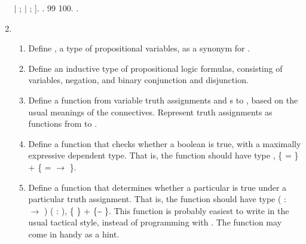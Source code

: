 \documentclass[12pt]{report}
\begin{document}
\begin{enumerate}
\begin{coqdoccode}
\coqdocindent{4.00em}
 \ensuremath{|}\coqdoceol
\coqdocindent{4.00em}
 ;  \ensuremath{|}\coqdoceol
\coqdocindent{4.00em}
 ;  ].\coqdoceol
\coqdocindent{1.00em}
.\coqdoceol
\coqdocemptyline
\coqdocindent{1.00em}
    99 100.\coqdoceol
\coqdocemptyline
\coqdocnoindent
{} .\coqdoceol
\coqdocemptyline
\end{coqdoccode}
\item \begin{enumerate}
  \item Define , a type of propositional variables, as a synonym for .
  \item Define an inductive type  of propositional logic formulas, consisting of variables, negation, and binary conjunction and disjunction.
  \item Define a function  from variable truth assignments and s to , based on the usual meanings of the connectives.  Represent truth assignments as functions from  to .
  \item Define a function  that checks whether a boolean is true, with a maximally expressive dependent type.  That is, the function should have type \coqdockw{\ensuremath{\forall}} , \{ = \} + \{ =  \ensuremath{\rightarrow} \}. 
  \item Define a function  that determines whether a particular  is true under a particular truth assignment.  That is, the function should have type \coqdockw{\ensuremath{\forall}} ( :  \ensuremath{\rightarrow} ) ( : ), \{  \} + \{\~{}   \}.  This function is probably easiest to write in the usual tactical style, instead of programming with .  The function  may come in handy as a hint.

\end{enumerate}
\end{enumerate}
\end{document}

